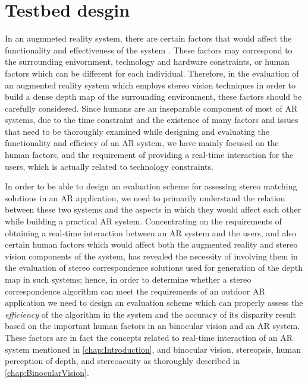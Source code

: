 \section{Testbed desgin}

In an augmneted reality system, there are certain factors that would affect the functionality and effectiveness of the system \cite{dras96,liv05}. These factors may correspond to the surrounding 
enivornment, technology and hardware constraints, or human factors which can be different for each individual. Therefore, in the evaluation of an augmented reality system 
which employs stereo vision techniques in order to build a dense depth map of the surrounding environment, these factors should be carefully considered. 
Since humans are an inseparable component of most of AR systems, due to the time constraint and the existence of many factors and issues that need to be thoroughly 
examined while designing and evaluating the functionality and efficiecy of an AR system, we have mainly focused on the human factors, and the requirement of providing a real-time interaction for
the users, which is actually related to technology constraints. 

In order to be able to design an evaluation scheme for assessing stereo matching solutions in an AR application, we need to primarily understand the relation between these two systems and
the aspects in which they would affect each other while building a practical AR system. Concentrating on the requirements of obtaining a real-time interaction between an AR system and the users, and
also certain human factors which would affect both the augmented reality and stereo vision components of the system,
has revealed the necessity of involving them in the evaluation of stereo correspondence solutions used for generation of the depth map in such systems; hence, in order to 
determine whether a stereo correspondence algorithm can meet the requirements of an outdoor AR application we need to design an evaluation scheme which can properly assess 
the \textit{efficiency} of the algorithm in the system and the accuracy of its disparity result based on the important human factors in an binocular vision and an AR system.
These factors are in fact the concepts related to real-time interaction of an AR system mentioned in \ref{chap:Introduction}, and binocular vision, stereopsis, human perception of depth, 
and stereoacuity as thoroughly described in \ref{chap:BinocularVision}.

